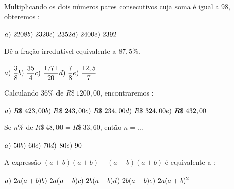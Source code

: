 \hline
\vfill

\begin{quest}
	Multiplicando os dois n\'umeros pares consecutivos cuja soma \'e igual a $98$, obteremos : \\ \\
	\(\displaystyle a)\ 2208 \hfill b)\ 2320 \hfill c)\ 2352 \hfill d)\ 2400 \hfill e)\ 2392 \)
\end{quest}

\hline
\vfill

\begin{quest}
	D\^e a fra\c{c}\~ao irredut\'ivel equivalente a $87,5\%$. \\ \\
	\(\displaystyle a)\ \frac{3}{8} \hfill b)\ \frac{35}{4} \hfill c)\ \frac{1771}{20} \hfill d)\ \frac{7}{8} \hfill e)\ \frac{12,5}{7} \)
\end{quest}

\hline
\vfill

\begin{quest}
	Calculando $36\%$ de $R\$\ 1200,00$, encontraremos : \\ \\
	\(\displaystyle a)\ R\$\ 423,00 \hfill b)\ R\$\ 243,00 \hfill c)\ R\$\ 234,00 \hfill \\ d)\ R\$\ 324,00 \hfill e)\ R\$\ 432,00 \)
\end{quest}

\newpage

\begin{quest}
	Se $n\%$ de $R\$\ 48,00 = R\$\ 33,60$, ent\~ao $n = \dots$ \\ \\
	\(\displaystyle a)\ 50 \hfill b)\ 60 \hfill c)\ 70 \hfill d)\ 80 \hfill e)\ 90 \)
\end{quest}

\hline
\vfill

\begin{quest}
	A express\~ao \(\displaystyle (a+b)(a+b) + (a-b)(a+b)\) \'e equivalente a : \\ \\
	\(\displaystyle a)\ 2a(a+b) \hfill b)\ 2a(a-b) \hfill c)\ 2b(a+b) \hfill \\ \\ d)\ 2b(a-b) \hfill e)\ 2a(a+b)^2 \)
\end{quest}

